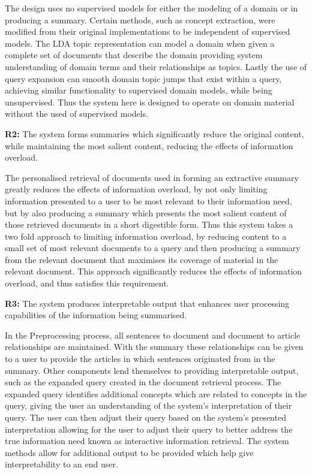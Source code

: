 The design uses no supervised models for either the modeling of a domain or in producing a summary. Certain methods, such as concept extraction, were modified from their original implementations to be independent of supervised models. The LDA topic representation can model a domain when given a complete set of documents that describe the domain providing system understanding of domain terms and their relationships as topics. Lastly the use of query expansion can smooth domain topic jumps that exist within a query, achieving similar functionality to supervised domain models, while being unsupervised. Thus the system here is designed to operate on domain material without the used of supervised models.

\textbf{R2:} The system forms summaries which significantly reduce the original content, while maintaining the most salient content, reducing the effects of information overload.

The personalised retrieval of documents used in forming an extractive summary greatly reduces the effects of information overload, by not only limiting information presented  to a user to be most relevant to their information need, but by also producing a summary which presents the most salient content of those retrieved documents in a short digestible form. Thus this system takes a two fold approach to limiting information overload, by reducing content to a small set of most relevant documents to a query and then producing a summary from the relevant document that maximises its coverage of material in the relevant document. This approach significantly reduces the effects of information overload, and thus satisfies this requirement.

\textbf{R3:} The system produces interpretable output that enhances user processing capabilities of the information being summarised.

In the Preprocessing process, all sentences to document and document to article relationships are maintained. With the summary these relationships can be given to a user to provide the articles in which sentences originated from in the summary. Other components lend themselves to providing interpretable output, such as the expanded query created in the document retrieval process. The expanded query identifies additional concepts which are related to concepts in the query, giving the user an understanding of the system’s interpretation of their query. The user can then adjust their query based on the system's presented interpretation allowing for the user to adjust their query to better address the true information need known as interactive information retrieval. The system methods allow for additional output to be provided which help give interpretability to an end user. 

